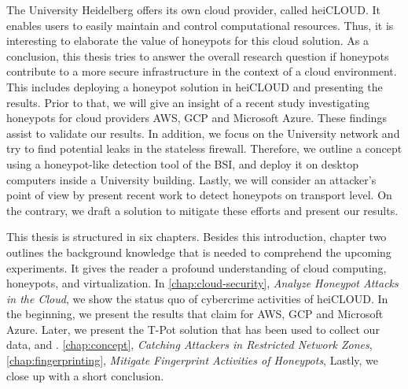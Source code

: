 The University Heidelberg offers its own cloud provider, called heiCLOUD.
It enables users to easily maintain and control computational resources. 
Thus, it is interesting to elaborate the value of honeypots for this cloud solution.
As a conclusion, this thesis tries to answer the overall research question if honeypots contribute to a more secure infrastructure in the context of a cloud environment.
This includes deploying a honeypot solution in heiCLOUD and presenting the results.
Prior to that, we will give an insight of a recent study investigating honeypots for cloud providers AWS, GCP and Microsoft Azure.
These findings assist to validate our results.
In addition, we focus on the University network and try to find potential leaks in the stateless firewall.
Therefore, we outline a concept using a honeypot-like detection tool of the BSI, and deploy it on desktop computers inside a University building.
Lastly, we will consider an attacker's point of view by present recent work to detect honeypots on transport level.
On the contrary, we draft a solution to mitigate these efforts and present our results.

This thesis is structured in six chapters.
Besides this introduction, chapter two outlines the background knowledge that is needed to comprehend the upcoming experiments.
It gives the reader a profound understanding of cloud computing, honeypots, and virtualization.
In \autoref{chap:cloud-security}, \textit{Analyze Honeypot Attacks in the Cloud}, we show the status quo of cybercrime activities of heiCLOUD.
In the beginning, we present the results that \citet{Kelly2021} claim for AWS, GCP and Microsoft Azure.
Later, we present the T-Pot solution that has been used to collect our data, and .
\autoref{chap:concept}, \textit{Catching Attackers in Restricted Network Zones},
\autoref{chap:fingerprinting}, \textit{Mitigate Fingerprint Activities of Honeypots},
Lastly, we close up with a short conclusion.
